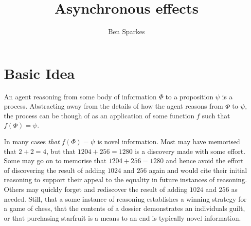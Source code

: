 \documentclass[10pt]{article}
\title{Asynchronous effects}
\author{Ben Sparkes}
\begin{document}
\maketitle

\section{Basic Idea}
\label{sec:basic-idea}

An agent reasoning from some body of information \(\Phi\) to a proposition \(\psi\) is a process.
Abstracting away from the details of how the agent reasons from \(\Phi\) to \(\psi\), the process can be though of as an application of some function \(f\) such that \(f(\Phi) = \psi\).


In many cases \emph{that} \(f(\Phi) = \psi\) is novel information.
Most may have memorised that \(2 + 2 = 4\), but that \(1204 + 256 = 1280\) is a discovery made with some effort.
Some may go on to memorise that \(1204 + 256 = 1280\) and hence avoid the effort of discovering the result of adding \(1024\) and \(256\) again and would cite their initial reasoning to support their appeal to the equality in future instances of reasoning.
Others may quickly forget and rediscover the result of adding \(1024\) and \(256\) as needed.
Still, that a some instance of reasoning establishes a winning strategy for a game of chess, that the contents of a dossier demonstrates an individuals guilt, or that purchasing starfruit is a means to an end is typically novel information.
\end{document}
